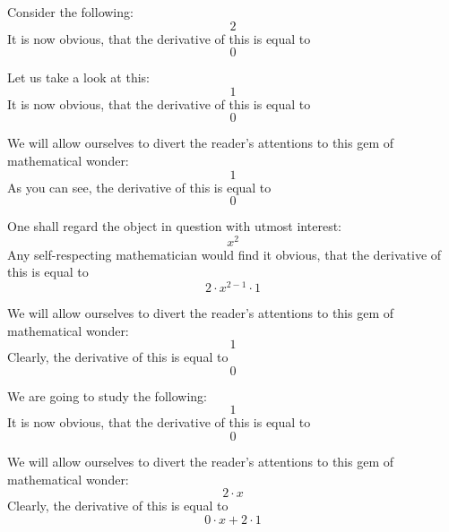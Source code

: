 \documentclass{article}
\begin{document}
Consider the following:
\begin{equation}
2 
\end{equation}
It is now obvious, that the derivative of this is equal to
\begin{equation}
0 
\end{equation}

Let us take a look at this:
\begin{equation}
1 
\end{equation}
It is now obvious, that the derivative of this is equal to
\begin{equation}
0 
\end{equation}

We will allow ourselves to divert the reader's attentions to this gem of mathematical wonder:
\begin{equation}
1 
\end{equation}
As you can see, the derivative of this is equal to
\begin{equation}
0 
\end{equation}

One shall regard the object in question with utmost interest:
\begin{equation}
x ^{2 } 
\end{equation}
Any self-respecting mathematician would find it obvious, that the derivative of this is equal to
\begin{equation}
2 \cdot x ^{2 - 1 } \cdot 1 
\end{equation}

We will allow ourselves to divert the reader's attentions to this gem of mathematical wonder:
\begin{equation}
1 
\end{equation}
Clearly, the derivative of this is equal to
\begin{equation}
0 
\end{equation}

We are going to study the following:
\begin{equation}
1 
\end{equation}
It is now obvious, that the derivative of this is equal to
\begin{equation}
0 
\end{equation}

We will allow ourselves to divert the reader's attentions to this gem of mathematical wonder:
\begin{equation}
2 \cdot x 
\end{equation}
Clearly, the derivative of this is equal to
\begin{equation}
0 \cdot x + 2 \cdot 1 
\end{equation}
\end{document}
